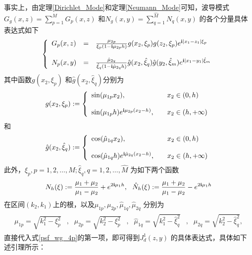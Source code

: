 事实上，由定理\ref{Dirichlet_Mode}和定理\ref{Neumann_Mode}可知，波导模式$G_g(x,z)=\sum\limits_{p=1}^MG_p(x,z)$ 和$N_g(x,y)=\sum\limits_{q=1}^{\hat M}N_q(x,y)$ 的各个分量具体表达式如下
\begin{eqnarray*}
 \left\{
 \begin{array}{lll}
    G_p(x,z)&=&\frac{\mu_{2p}}{\xi_p(1-\mathbf{i}\mu_{2p}h)}g(x_2,\xi_p)g(z_2,\xi_p)e^{\mathbf{i}|x_1-z_1|\xi_p}\\
    & &\\
    N_p(x,y)&=&\frac{\hat\mu_{2q}}{\hat\xi_q(1-\mathbf{i}\hat\mu_{2q}h)}\hat g(x_2,\hat\xi_q)\hat g(y_2,\hat\xi_m)e^{\mathbf{i}|x_1-y_1|\hat\xi_m}\\
 \end{array}
 \right.
\end{eqnarray*}
 其中函数$g(x_2,\xi_p)$ 和$\hat g(x_2,\hat\xi_q)$分别为
 \begin{eqnarray*}
 g(x_2,\xi_p):=\left\{
 \begin{array}{lll}
   \sin(\mu_{1p}x_2),& &x_2\in(0,h)\\
   & &\\
   \sin(\mu_{1p}h)e^{\mathbf{i}\mu_{2p}(x_2-h)},& &x_2\in(h,+\infty)
 \end{array}
 \right.
 \end{eqnarray*}
 和
\begin{eqnarray*}
\hat g(x_2,\hat\xi_q):=\left\{
 \begin{array}{lll}
   \cos(\hat\mu_{1q}x_2),& &x_2\in(0,h)\\
   & &\\
   \cos(\hat\mu_{1q}h)e^{\mathbf{i}\hat\mu_{2q}(x_2-h)},& &x_2\in(h,+\infty)
 \end{array}
 \right.
\end{eqnarray*}
此外，$\xi_p,p=1,2,\ldots,M;\hat\xi_q,q=1,2,\ldots,\hat M$ 为如下两个函数
\begin{eqnarray*}
N_h(\xi):=\frac{\mu_1+\mu_2}{\mu_1-\mu_2}+e^{2\mathbf{i}\mu_1h},\ \
\hat N_h(\xi):=\frac{\mu_1+\mu_2}{\mu_1-\mu_2}-e^{2\mathbf{i}\mu_1h}
\end{eqnarray*}
在区间$(k_2,k_1)$上的根，以及$\mu_{1p},\mu_{2p},\hat\mu_{1q},\hat\mu_{2q}$ 分别为
\begin{eqnarray*}
\begin{array}{lllllll}
\mu_{1p}=\sqrt{k_1^2-\xi_p^2}&,&\mu_{2p}=\sqrt{k_2^2-\xi_p^2}&,&\hat\mu_{1q}=\sqrt{k_1^2-\hat\xi_q^2}&,&
\hat\mu_{2q}=\sqrt{k_2^2-\hat\xi_q^2},
\end{array}
\end{eqnarray*}
直接代入式\ref{psf_wg_4p}的第一项，即可得到$J_d^1(z,y)$ 的具体表达式，具体如下述引理所示：
